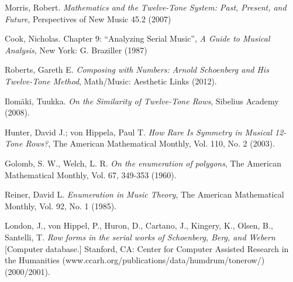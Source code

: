 \begin{thebibliography}{00}
			{\sc Morris, Robert.}
			\textit{Mathematics and the Twelve-Tone System: Past, Present, and Future},
			Perspectives of New Music 45.2 
			(2007)
			
			{\sc Cook, Nicholas.} Chapter 9: “Analyzing Serial Music”,
			\textit{A Guide to Musical Analysis},
			New York: G. Braziller
			(1987)
			
			{\sc Roberts, Gareth E.}
			\textit{Composing with Numbers: Arnold Schoenberg and His Twelve-Tone Method},
			Math/Music: Aesthetic Links
			(2012).
			
			{\sc Ilom\"aki, Tuukka.}
			\textit{On the Similarity of Twelve-Tone Rows},
			Sibelius Academy
			(2008).
	
			{\sc Hunter, David J.; von Hippela, Paul T.}
			\textit{How Rare Is Symmetry in Musical 12-Tone Rows?},
			The American Mathematical Monthly, Vol. 110, No. 2
			(2003).
			
			{\sc Golomb, S. W., Welch, L. R.}
			\textit{On the enumeration of polygons},
			The American Mathematical Monthly, Vol. 67, 349-353
			(1960).
			
			{\sc Reiner, David L.}
			\textit{Enumeration in Music Theory},
			The American Mathematical Monthly, Vol. 92, No. 1
			(1985).
			
			{\sc London, J., von Hippel, P., Huron, D., Cartano, J., Kingery, K., Olsen, B., Santelli, T.}
			\textit{Row forms in the serial works of Schoenberg, Berg, and Webern}
			[Computer database.] Stanford, CA: Center for Computer Assisted Research in the Humanities (www.ccarh.org/publications/data/humdrum/tonerow/) (2000/2001).
						
	\end{thebibliography}